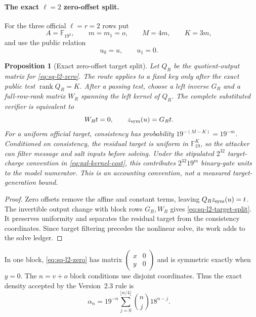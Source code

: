 \documentclass[11pt]{article}
\newtheorem{proposition}[proposition]{Proposition}
\newcommand{\F}{\mathbb F}
\newcommand{\rank}{\operatorname{rank}}
\begin{document}
\paragraph{The exact $\ell=2$ zero-offset split.}
For the three official $\ell=r=2$ rows put
\[
 A=\F_{19^2},\qquad m=m_1=o,\qquad M=4m,\qquad K=3m,
\]
and use the public relation
\begin{equation}
 u_0=u,\qquad u_1=0.                                  \label{eq:sq-l2-zero}
\end{equation}

\begin{proposition}[Exact zero-offset target split]
\label{prop:sq-zero-split}
Let $Q_R$ be the quotient-output matrix for \eqref{eq:sq-l2-zero}.  The
route applies to a fixed key only after the exact public test
$\rank Q_R=K$.  After a passing test, choose a left inverse $G_R$ and a
full-row-rank matrix $W_R$ spanning the left kernel of $Q_R$.  The complete
substituted verifier is equivalent to
\begin{equation}
 W_Rt=0,\qquad z_{\rm sym}(u)=G_Rt.                  \label{eq:sq-l2-target-split}
\end{equation}
For a uniform official target, consistency has probability
$19^{-(M-K)}=19^{-m}$.  Conditioned on consistency, the residual target is
uniform in $\F_{19}^K$, so the attacker can filter message and salt inputs
before solving.  Under the stipulated $2^{32}$ target-charge convention in
\eqref{eq:pxl-kernel-cost}, this contributes $2^{32}19^m$ binary-gate units
to the model numerator.  This is an accounting convention, not a measured
target-generation bound.
\end{proposition}

\begin{proof}
Zero offsets remove the affine and constant terms, leaving
$Q_Rz_{\rm sym}(u)=t$.  The invertible output change with block rows
$G_R,W_R$ gives \eqref{eq:sq-l2-target-split}.  It preserves uniformity and
separates the residual target from the consistency coordinates.  Since target
filtering precedes the nonlinear solve, its work adds to the solve ledger.
\end{proof}

In one block, \eqref{eq:sq-l2-zero} has matrix
$\left(\begin{smallmatrix}x&0\\y&0\end{smallmatrix}\right)$ and is symmetric
exactly when $y=0$.  The $n=v+o$ block conditions use disjoint coordinates.
Thus the exact density accepted by the Version~2.3 rule is
\begin{equation}
 \alpha_n=19^{-n}\sum_{j=0}^{\lfloor n/4\rfloor}
          \binom nj18^{n-j}.                          \label{eq:sq-l2-alpha}
\end{equation}
\end{document}
